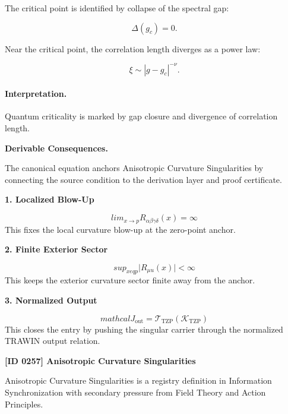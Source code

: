 The critical point is identified by collapse of the spectral gap:

\begin{equation}
\Delta(g_c)=0 .
\end{equation}

Near the critical point, the correlation length diverges as a power law:

\begin{equation}
\boxed{
\xi \sim |g-g_c|^{-\nu}.
}
\end{equation}

\paragraph{Interpretation.}
Quantum criticality is marked by gap closure and divergence of correlation length.

\par\vspace{0.35em}
\noindent\textbf{Derivable Consequences.}\quad
\begingroup
\footnotesize
\raggedright
The canonical equation anchors Anisotropic Curvature Singularities by connecting the source condition to the derivation layer and proof certificate.
\par\endgroup

\noindent\textbf{1. Localized Blow-Up}\par
\[
lim_{x\to p} R_{\alpha\beta\gamma\delta}(x) = \infty
\]
\noindent This fixes the local curvature blow-up at the zero-point anchor.\par
\noindent\textbf{2. Finite Exterior Sector}\par
\[
sup_{x eq p}\lvert R_{\mu u}(x)\rvert < \infty
\]
\noindent This keeps the exterior curvature sector finite away from the anchor.\par
\noindent\textbf{3. Normalized Output}\par
\[
mathcal{J}_{\mathrm{out}} = \mathcal{T}_{\mathrm{TZP}}\!\left(\mathcal{K}_{\mathrm{TZP}}\right)
\]
\noindent This closes the entry by pushing the singular carrier through the normalized TRAWIN output relation.\par

\clearpage
\noindent\textbf{[ID 0257] Anisotropic Curvature Singularities}\par
\vspace{0.35em}
\begingroup\small
{}
Anisotropic Curvature Singularities is a registry definition in Information Synchronization with secondary pressure from Field Theory and Action Principles.

